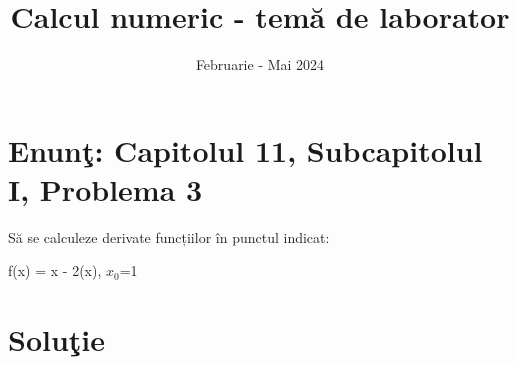\documentclass{article}
\begin{document}
\title{Calcul numeric - tem\u{a} de laborator}

\author{}

\date{Februarie - Mai 2024}

\maketitle              %








\section*{Enun\c{t}: Capitolul 11, Subcapitolul I, Problema 3}

S\u{a} se calculeze derivate funcțiilor în punctul indicat:

\begin{center}
f(x) = x - 2\cos(x), \quad $x_0$=1

\end{center}

\section*{Solu\c{t}ie}
\end{document}
